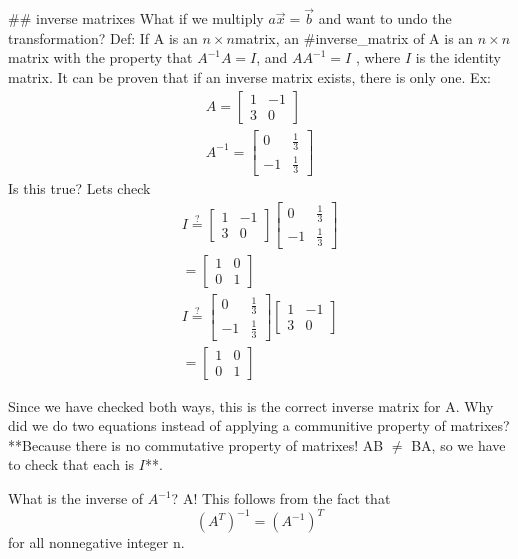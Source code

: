 ## inverse matrixes
What if we multiply $a\vec{x}=\vec{b}$
and want to undo the transformation? 
Def: If A is an $n\times n$matrix, an #inverse_matrix of A is an $n\times n$ matrix with the property that 
$A^{-1}A = I$, and $AA^{-1}=I$ , where $I$ is the identity matrix. It can be proven that if an inverse matrix exists, there is only one. 
Ex:
$$
\begin{align}
A=\begin{bmatrix}
1 & -1 \\
3 & 0  
\end{bmatrix}
 \\
A^{-1}=\begin{bmatrix}
0 & \frac{1}{3} \\
-1 & \frac{1}{3}
\end{bmatrix}
\end{align}
$$
Is this true? Lets check
$$
\begin{align}
I \stackrel{?}{=} \begin{bmatrix}
1 & -1 \\
3 & 0  
\end{bmatrix}\begin{bmatrix}
0 & \frac{1}{3} \\
-1 & \frac{1}{3}
\end{bmatrix} \\
= \begin{bmatrix}
1 & 0 \\
0 & 1
\end{bmatrix} \\
I \stackrel{?}{=} \begin{bmatrix}
0 & \frac{1}{3} \\
-1 & \frac{1}{3}
\end{bmatrix} \begin{bmatrix}
1 & -1 \\
3 & 0  
\end{bmatrix}\\
= \begin{bmatrix}
1 & 0 \\
0 & 1
\end{bmatrix}
\end{align}
$$

Since we have checked both ways, this is the correct inverse matrix for A. Why did we do two equations instead of applying a communitive property of matrixes?**Because there is no commutative property of matrixes! AB $\neq$ BA, so we have to check that each is $I$**. 

What is the inverse of $A^{-1}$? A! This follows from the fact that $$
(A^{T})^{-1}=(A^{-1})^{T}
$$ for all nonnegative integer n.

